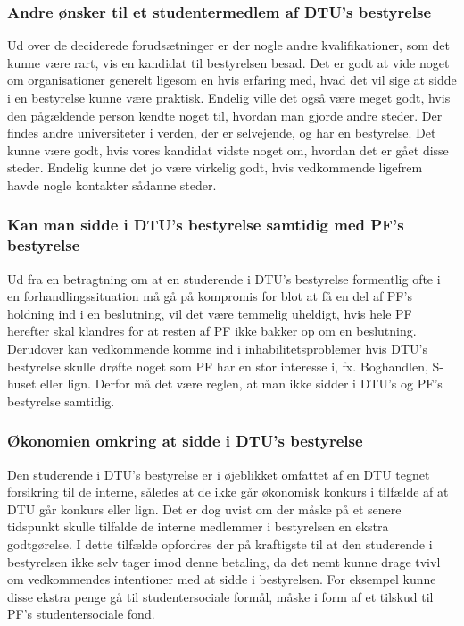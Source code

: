 \subsubsection{Andre ønsker til et studentermedlem af DTU’s bestyrelse} 
Ud over de deciderede forudsætninger er der nogle andre kvalifikationer, som det kunne være rart, vis en kandidat til bestyrelsen besad. Det er godt at vide noget om organisationer generelt ligesom en hvis erfaring med, hvad det vil sige at sidde i en bestyrelse kunne være praktisk. Endelig ville det også være meget godt, hvis den pågældende person kendte noget til, hvordan man gjorde andre steder. Der findes andre universiteter i verden, der er selvejende, og har en bestyrelse. Det kunne være godt, hvis vores kandidat vidste noget om, hvordan det er gået disse steder. Endelig kunne det jo være virkelig godt, hvis vedkommende ligefrem havde nogle kontakter sådanne steder.

\subsubsection{Kan man sidde i DTU’s bestyrelse samtidig med PF’s bestyrelse}
Ud fra en betragtning om at en studerende i DTU’s bestyrelse formentlig ofte i en forhandlingssituation må gå på kompromis for blot at få en del af PF’s holdning ind i en beslutning, vil det være temmelig uheldigt, hvis hele PF herefter skal klandres for at resten af PF ikke bakker op om en beslutning. Derudover kan vedkommende komme ind i inhabilitetsproblemer hvis DTU’s bestyrelse skulle drøfte noget som PF har en stor interesse i, fx. Boghandlen, S-huset eller lign.
Derfor må det være reglen, at man ikke sidder i DTU’s og PF’s bestyrelse samtidig.

\subsubsection{Økonomien omkring at sidde i DTU’s bestyrelse}
Den studerende i DTU’s bestyrelse er i øjeblikket omfattet af en DTU tegnet forsikring til de interne, således at de ikke går økonomisk konkurs i tilfælde af at DTU går konkurs eller lign. Det er dog uvist om der måske på et senere tidspunkt skulle tilfalde de interne medlemmer i bestyrelsen en ekstra godtgørelse. I dette tilfælde opfordres der på kraftigste til at den studerende i bestyrelsen ikke selv tager imod denne betaling, da det nemt kunne drage tvivl om vedkommendes intentioner med at sidde i bestyrelsen. For eksempel kunne disse ekstra penge gå til studentersociale formål, måske i form af et tilskud til PF’s studentersociale fond.

